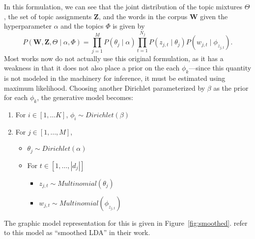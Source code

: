 \documentclass[11pt]{article}
\begin{document}
In this formulation, we can see that the joint distribution of the topic
mixtures $\Theta$, the set of topic assignments $\mathbf{Z}$, and the words
in the corpus $\mathbf{W}$ given the hyperparameter $\alpha$ and the topics
$\Phi$ is given by
\begin{equation}
  P(\mathbf{W}, \mathbf{Z}, \Theta \mid \alpha, \Phi)
  = \prod_{j=1}^M P(\theta_j \mid \alpha)
  \prod_{t=1}^{N_j} P(z_{j,t} \mid \theta_j) P(w_{j,t} \mid
  \phi_{z_{j,t}}).
  \label{eqn:fulljoint}
\end{equation}
Most works now do not actually use this original formulation, as it has a
weakness in that it does not also place a prior on the each
$\phi_k$---since this quantity is not modeled in the machinery for
inference, it must be estimated using maximum likelihood. Choosing another
Dirichlet parameterized by $\beta$ as the prior for each $\phi_k$, the
generative model becomes:

\begin{enumerate}
  \item For $i\in[1,\ldots K]$, $\phi_i \sim Dirichlet(\beta)$
  \item For $j\in[1, \ldots, M]$,
    \begin{itemize}
      \item $\theta_j \sim Dirichlet(\alpha)$
      \item For $t \in [1,\ldots, |d_j|]$
        \begin{itemize}
          \item $z_{j,t} \sim Multinomial(\theta_j)$
          \item $w_{j,t} \sim Multinomial(\phi_{z_{j,t}})$
        \end{itemize}
    \end{itemize}
\end{enumerate}
The graphic model representation for this is given in
Figure~\ref{fig:smoothed}. \citeauthor{Blei:2003:LDA} refer to this model as
``smoothed LDA'' in their work.
\end{document}
